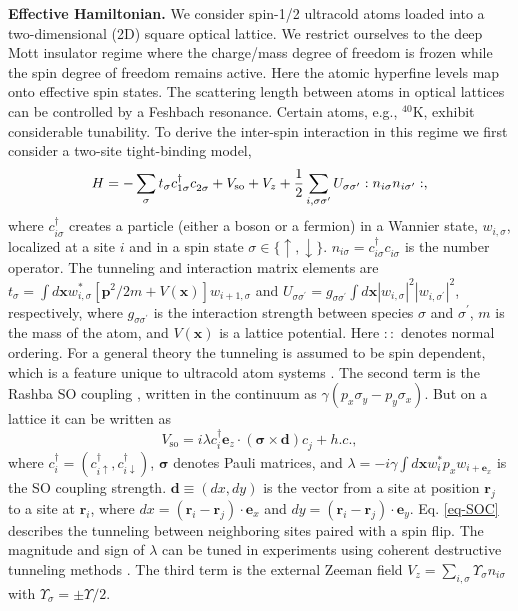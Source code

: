 \documentclass[a4paper,showpacs]{revtex4}
\begin{document}
\noindent \textbf{{\small Effective Hamiltonian.}}
We consider spin-1/2 ultracold atoms loaded
into a two-dimensional (2D) square optical lattice. We restrict ourselves to
the deep Mott insulator regime where the charge/mass degree of freedom is
frozen while the spin degree of freedom remains active. Here the atomic
hyperfine levels map onto effective spin states. The scattering length
between atoms in optical lattices can be controlled by a Feshbach
resonance.  Certain atoms, e.g., $^{40}$K, exhibit considerable tunability\cite{Kohl}. To derive the inter-spin interaction in this regime
we first consider a two-site tight-binding model,
\begin{equation}
H=-\sum_{\sigma }t_{\sigma }c_{1\sigma }^{\dagger }c_{2\sigma }^{%
\phantom{\dagger}}+V_{\text{so}}+V_{z}+{\frac{1}{2}}\sum_{i,\sigma \sigma
^{\prime }}U_{\sigma \sigma ^{\prime }}:n_{i\sigma }n_{i\sigma ^{\prime }}:,
\label{eq-H}
\end{equation}%
where $c_{i\sigma }^{\dagger }$ creates a particle (either a boson or a
fermion) in a Wannier state, $w_{i,\sigma }$, localized at a site $i$ and in
a spin state $\sigma \in \{\uparrow ,\downarrow \}$. $n_{i\sigma
}=c_{i\sigma }^{\dagger }c_{i\sigma }^{\phantom{\dagger}}$ is the number operator. The tunneling and interaction matrix elements are $t_{\sigma}=\int d\mathbf{x}w_{i,\sigma}^{\ast
}[\mathbf{p}^{2}/2m+V(\mathbf{x})]w_{i+1,\sigma}$ and $U_{\sigma
\sigma ^{\prime }}=g_{\sigma \sigma ^{\prime }}\int d\mathbf{x}|w_{i,\sigma
}|^{2}|w_{i,\sigma ^{\prime }}|^{2}$, respectively, where $g_{\sigma \sigma ^{\prime }}$
is the interaction strength between species $\sigma $ and $\sigma ^{\prime }$, $m$ is the mass of the atom, 
and $V(\mathbf{x})$ is a lattice potential. Here $::$ denotes normal ordering. For a general theory the tunneling is
assumed to be spin dependent, which is a feature unique to ultracold atom
systems \cite{Duan, Altman}. The second term is the Rashba SO coupling \cite
{YPPRL},  written in the continuum as $\gamma (p_{x}\sigma _{y}-p_{y}\sigma _{x})$. But on a lattice it can be written as
\begin{equation}
V_{\text{so}}=i\lambda c_{i}^{\dagger }\mathbf{e}_{z}\cdot (\boldsymbol{\sigma} \times
\mathbf{d})c_{j}^{\phantom{\dagger}}+h.c.,
\label{eq-SOC}
\end{equation}%
where $c_{i}^{\dagger }=(c_{i\uparrow }^{\dagger },c_{i\downarrow }^{\dagger
})$, $\boldsymbol{\sigma}$ denotes Pauli matrices, and $\lambda=-i\gamma \int d\mathbf{x} w_{i}^{\ast
} p_x w_{i+\mathbf{e}_{x}} $ is the SO coupling strength. $\mathbf{d\equiv }\left( dx,dy\right) $ is the vector from a site at position $\boldsymbol{r}_{j}$ to a site at $\boldsymbol{r}_{i}$, where $dx=\left(\boldsymbol{r}_{i}-\boldsymbol{r}_{j}\right)\cdot \mathbf{e}_{x}$ and $dy=\left(\boldsymbol{r}_{i}-\boldsymbol{r}_{j}\right)\cdot \mathbf{e}_{y}$. Eq. \ref{eq-SOC}  describes the tunneling between neighboring sites paired with a spin flip. The magnitude and sign of $%
\lambda $ can be tuned in experiments using coherent destructive tunneling
methods \cite{YP}. The third term is the external Zeeman field $%
V_{z}=\sum_{i,\sigma }\Upsilon _{\sigma }n_{i\sigma }$ with $\Upsilon
_{\sigma }=\pm \Upsilon /2$.
\end{document}
